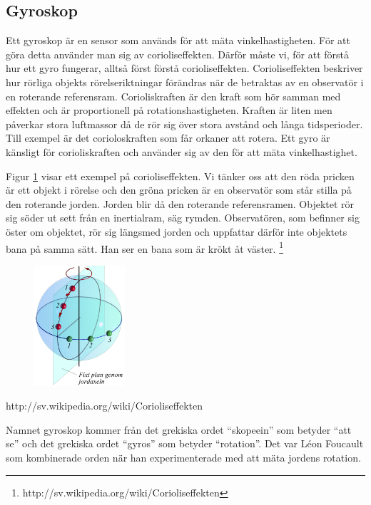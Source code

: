 \documentclass[a4paper,12pt,fleqn]{article}
\begin{document}
\subsection{Gyroskop}
Ett gyroskop är en sensor som används för att mäta vinkelhastigheten. För att göra detta använder man sig av corioliseffekten. Därför måste vi, för att förstå hur ett gyro fungerar, alltså först förstå corioliseffekten. Corioliseffekten beskriver hur rörliga objekts rörelseriktningar förändras när de betraktas av en observatör i en roterande referensram. Corioliskraften är den kraft som hör samman med effekten och är proportionell på rotationshastigheten. Kraften är liten men påverkar stora luftmassor då de rör sig över stora avstånd och långa tidsperioder. Till exempel är det corioloskraften som får orkaner att rotera. Ett gyro är känsligt för corioliskraften och använder sig av den för att mäta vinkelhastighet.

Figur \ref{fig:jord} visar ett exempel på corioliseffekten. Vi tänker oss att den röda pricken är ett objekt i rörelse och den gröna pricken är en observatör som står stilla på den roterande jorden. Jorden blir då den roterande referensramen. Objektet rör sig söder ut sett från en inertialram, säg rymden. Observatören, som befinner sig öster om objektet, rör sig längsmed jorden och uppfattar därför inte objektets bana på samma sätt. Han ser en bana som är krökt åt väster.
\footnote{http://sv.wikipedia.org/wiki/Corioliseffekten}


\begin{figure}[h]
\label{fig:jord}
\caption{}
\includegraphics[width=0.3\textwidth]
{Coriolisjord.png}
\end{figure}
http://sv.wikipedia.org/wiki/Corioliseffekten


Namnet  gyroskop kommer från det grekiska ordet “skopeein” som betyder “att se” och det grekiska ordet “gyros” som betyder “rotation”. Det var Léon Foucault som kombinerade orden när han experimenterade med att mäta jordens rotation.
\end{document}
